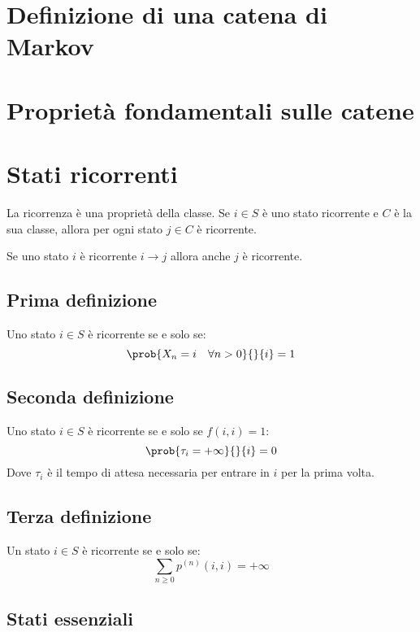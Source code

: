 \documentclass[\main/main.tex]{subfiles}
\begin{document}
\section{Definizione di una catena di Markov}
\section{Proprietà fondamentali sulle catene}
\section{Stati ricorrenti}
La ricorrenza è una proprietà della classe. Se \(i \in S\) è uno stato ricorrente e \(C\) è la sua classe, allora per ogni stato \(j \in C\) è ricorrente.

Se uno stato \(i\) è ricorrente \(i \rightarrow j\) allora anche \(j\) è ricorrente.

\subsection{Prima definizione}
\begin{definition}
  Uno stato \(i \in S\) è ricorrente se e solo se:
  \[
    \prob{X_n = i \quad \forall n > 0}{}{i} = 1
  \]
\end{definition}
\subsection{Seconda definizione}
\begin{definition}
  Uno stato \(i \in S\) è ricorrente se e solo se \(f(i,i) = 1\):
  \[
    \prob{\tau_i = +\infty}{}{i} = 0
  \]
  Dove \(\tau_i\) è il tempo di attesa necessaria per entrare in \(i\) per la prima volta.
\end{definition}
\subsection{Terza definizione}
\begin{definition}
  Un stato \(i \in S \) è ricorrente se e solo se:
  \[
    \sum_{n\geq 0} p^{(n)}(i,i) = + \infty
  \]
\end{definition}
\subsection{Stati essenziali}
\end{document}
